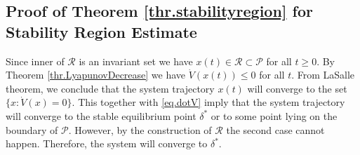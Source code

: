 \documentclass[final]{IEEEtran}
\begin{document}
\subsection{Proof of Theorem \ref{thr.stabilityregion} for Stability Region Estimate}
\label{appen:estimate}

Since inner of $\mathcal{R}$ is an invariant set we have $x(t) \in \mathcal{R} \subset \mathcal{P}$ for all $t\ge 0.$ By Theorem \ref{thr.LyapunovDecrease}
we have $\dot{V}(x(t)) \le 0$ for all $t.$ From LaSalle theorem, we conclude that the system trajectory $x(t)$ will converge to the 
set $\{x:\dot{V}(x)=0\}.$ This together with \eqref{eq.dotV} imply that the system trajectory will converge to the stable equilibrium point $\delta^*$
or to some point lying on the boundary of $\mathcal{P}.$ However, by the construction of $\mathcal{R}$ the second case cannot happen. Therefore, the system 
will converge to $\delta^*.$



\end{document}
